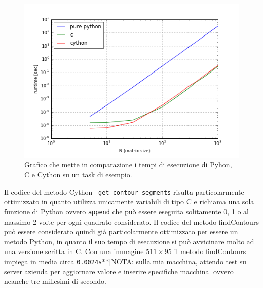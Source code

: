 \documentclass[12pt,a4paper]{report}
\begin{document}
\begin{figure}[H]
    \centering
    \includegraphics[scale=0.9]{img/cython-vs-c.png}
    \caption{Grafico che mette in comparazione i tempi di esecuzione di Pyhon, C e Cython su un task di esempio. 
}
\end{figure} 
Il codice del metodo Cython \verb|_get_contour_segments| risulta particolarmente ottimizzato in quanto utilizza unicamente variabili di tipo C e richiama una sola funzione di Python ovvero \verb|append| che può essere eseguita solitamente 0, 1 o al massimo 2 volte per ogni quadrato considerato. 
Il codice del metodo findContours può essere considerato quindi già particolarmente ottimizzato per essere un metodo Python, in quanto il suo tempo di esecuzione si può avvicinare molto ad una versione scritta in C. \newline
Con una immagine $511\times 95$ il metodo findContours impiega in media circa \verb|0.0024s|**[NOTA: sulla mia macchina,  attendo test su server azienda per aggiornare valore e inserire specifiche macchina] %
ovvero neanche tre millesimi di secondo.
\end{document}
